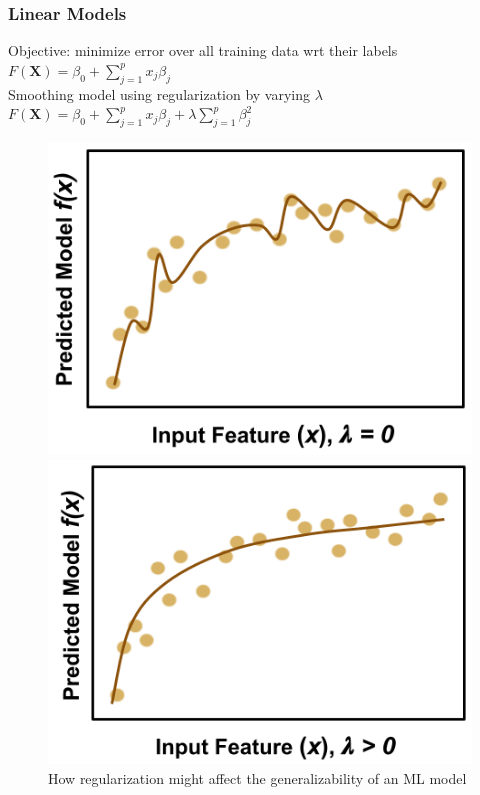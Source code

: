 \begin{frame}
  \frametitle{Linear Models}
  \begin{multicols}{2}
    Objective: minimize error over all training data wrt their labels\\
    $ F(\boldsymbol{X}) = \beta_{0} +  \sum_{j=1}^{p} x_{j} \beta_{j} $\\  
    Smoothing model using regularization by varying $\lambda$\\
    $ F(\boldsymbol{X}) = \beta_{0} +  \sum_{j=1}^{p} x_{j} \beta_{j} + \lambda \sum_{j=1}^{p} \beta_{j}^2 $
  \end{multicols}
  \begin{figure}[h!]
    \begin{minipage}{0.5\textwidth}
      \centering
      \includegraphics[width=0.85\linewidth]{./figures/regularization_n.png}
    \end{minipage}%
    \begin{minipage}{0.5\textwidth}
      \centering
      \includegraphics[width=0.85\linewidth]{./figures/regularization_y.png}
    \end{minipage}
    \caption{How regularization might affect the generalizability of an ML model}
  \end{figure}
\end{frame}

